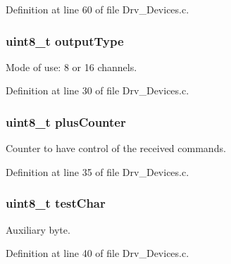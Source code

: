 Definition at line 60 of file Drv\+\_\+\+Devices.\+c.

\subsubsection[{\texorpdfstring{output\+Type}{outputType}}]{\setlength{\rightskip}{0pt plus 5cm}uint8\+\_\+t output\+Type}\hypertarget{group__Devices__Library_ga2bc20b2f7f3efa988afcd5c19b3e2edf}{}\label{group__Devices__Library_ga2bc20b2f7f3efa988afcd5c19b3e2edf}


Mode of use\+: 8 or 16 channels. 



Definition at line 30 of file Drv\+\_\+\+Devices.\+c.

\subsubsection[{\texorpdfstring{plus\+Counter}{plusCounter}}]{\setlength{\rightskip}{0pt plus 5cm}uint8\+\_\+t plus\+Counter}\hypertarget{group__Devices__Library_gac011c12f1d5ab04cb87b6edaec1d24ad}{}\label{group__Devices__Library_gac011c12f1d5ab04cb87b6edaec1d24ad}


Counter to have control of the received commands. 



Definition at line 35 of file Drv\+\_\+\+Devices.\+c.

\subsubsection[{\texorpdfstring{test\+Char}{testChar}}]{\setlength{\rightskip}{0pt plus 5cm}uint8\+\_\+t test\+Char}\hypertarget{group__Devices__Library_gae004df3f2b77e4d58eee171d2f76da40}{}\label{group__Devices__Library_gae004df3f2b77e4d58eee171d2f76da40}


Auxiliary byte. 



Definition at line 40 of file Drv\+\_\+\+Devices.\+c.


